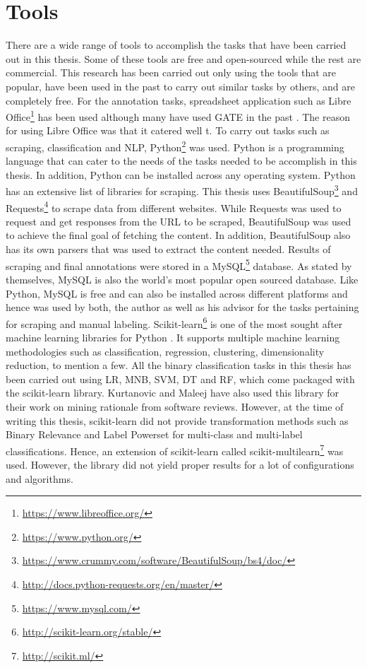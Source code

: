 \documentclass[a4paper,12pt,twoside]{report}
\begin{document}
\section{Tools}
There are a wide range of tools to accomplish the tasks that have been carried out in this thesis. Some of these tools are free and open-sourced while the rest are commercial. This research has been carried out only using the tools that are popular, have been used in the past to carry out similar tasks by others, and are completely free. 
\newline \newline
For the annotation tasks, spreadsheet application such as Libre Office\footnote{\url{https://www.libreoffice.org/}} has been used although many have used GATE in the past \cite{Lata2016}\cite{Nonnenmacher2017}. The reason for using Libre Office was that it catered well t. 
\newline \newline
To carry out tasks such as scraping, classification and NLP, Python\footnote{\url{https://www.python.org/}} was used. Python is a programming language that can cater to the needs of the tasks needed to be accomplish in this thesis. In addition, Python can be installed across any operating system. Python has an extensive list of libraries for scraping. This thesis uses BeautifulSoup\footnote{\url{https://www.crummy.com/software/BeautifulSoup/bs4/doc/}} and Requests\footnote{\url{http://docs.python-requests.org/en/master/}} to scrape data from different websites. While Requests was used to request and get responses from the URL to be scraped, BeautifulSoup was used to achieve the final goal of fetching the content. In addition, BeautifulSoup also has its own parsers that was used to extract the content needed.
\newline \newline
Results of scraping and final annotations were stored in a MySQL\footnote{\url{https://www.mysql.com/}} database. As stated by themselves, MySQL is also the world's most popular open sourced database. Like Python, MySQL is free and can also be installed across different platforms and hence was used by both, the author as well as his advisor for the tasks pertaining for scraping and manual labeling. 
\newline \newline
Scikit-learn\footnote{\url{http://scikit-learn.org/stable/}} is one of the most sought after machine learning libraries for Python \cite{Pedregosa2012}. It supports multiple machine learning methodologies such as classification, regression, clustering, dimensionality reduction, to mention a few. All the binary classification tasks in this thesis has been carried out using LR, MNB, SVM, DT and RF, which come packaged with the scikit-learn library. Kurtanovic and Maleej \cite{Kurtanovic2017} have also used this library for their work on mining rationale from software reviews. However, at the time of writing this thesis, scikit-learn did not provide transformation methods such as Binary Relevance and Label Powerset for multi-class and multi-label classifications. Hence, an extension of scikit-learn called scikit-multilearn\footnote{\url{http://scikit.ml/}} was used. However, the library did not yield proper results for a lot of configurations and algorithms. 
\end{document}
